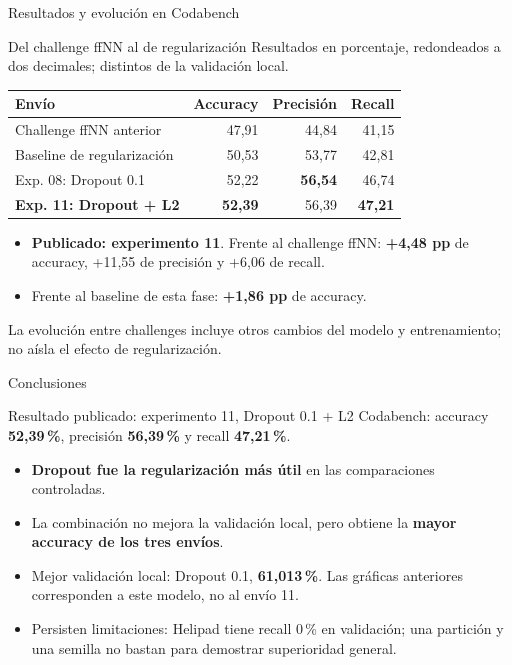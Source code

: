 \documentclass{beamer}
\begin{document}
\begin{frame}{Resultados y evolución en Codabench}
\small
\begin{block}{Del challenge ffNN al de regularización}
Resultados en porcentaje, redondeados a dos decimales; distintos de la validación local.
\end{block}
\renewcommand{\arraystretch}{1.4}\setlength{\tabcolsep}{6pt}
{\centering
\begin{tabular}{@{}l r r r@{}}
\toprule
\textbf{Envío} & \textbf{Accuracy} & \textbf{Precisión} & \textbf{Recall} \\
\midrule
Challenge ffNN anterior & 47,91 & 44,84 & 41,15 \\
\midrule
Baseline de regularización & 50,53 & 53,77 & 42,81 \\
Exp. 08: Dropout 0.1 & 52,22 & \textbf{56,54} & 46,74 \\
\textbf{Exp. 11: Dropout + L2} & \textbf{52,39} & 56,39 & \textbf{47,21} \\
\bottomrule
\end{tabular}
\par}
\medskip
\begin{itemize}
\item \textbf{Publicado: experimento 11}. Frente al challenge ffNN: \textbf{+4,48 pp} de accuracy, +11,55 de precisión y +6,06 de recall.
\item Frente al baseline de esta fase: \textbf{+1,86 pp} de accuracy.
\end{itemize}
\footnotesize La evolución entre challenges incluye otros cambios del modelo y entrenamiento; no aísla el efecto de regularización.
\end{frame}

\begin{frame}{Conclusiones}
\small
\begin{block}{Resultado publicado: experimento 11, Dropout 0.1 + L2}
Codabench: accuracy \textbf{52,39\,\%}, precisión \textbf{56,39\,\%} y recall \textbf{47,21\,\%}.
\end{block}
\begin{itemize}
\item \textbf{Dropout fue la regularización más útil} en las comparaciones controladas.
\item La combinación no mejora la validación local, pero obtiene la \textbf{mayor accuracy de los tres envíos}.
\item Mejor validación local: Dropout 0.1, \textbf{61,013\,\%}. Las gráficas anteriores corresponden a este modelo, no al envío 11.
\item Persisten limitaciones: Helipad tiene recall 0\,\% en validación; una partición y una semilla no bastan para demostrar superioridad general.
\end{itemize}
\end{frame}
\end{document}
